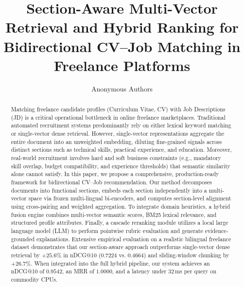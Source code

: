 \documentclass[runningheads]{llncs}
\begin{document}
\title{Section-Aware Multi-Vector Retrieval and Hybrid Ranking for Bidirectional CV--Job Matching in Freelance Platforms}


\author{Anonymous Authors}


\maketitle

\begin{abstract}
Matching freelance candidate profiles (Curriculum Vitae, CV) with Job Descriptions (JD) is a critical operational bottleneck in online freelance marketplaces. Traditional automated recruitment systems predominantly rely on either lexical keyword matching or single-vector dense retrieval. However, single-vector representations aggregate the entire document into an unweighted embedding, diluting fine-grained signals across distinct sections such as technical skills, practical experience, and education. Moreover, real-world recruitment involves hard and soft business constraints (e.g., mandatory skill overlap, budget compatibility, and experience thresholds) that semantic similarity alone cannot satisfy. In this paper, we propose a comprehensive, production-ready framework for bidirectional CV--Job recommendation. Our method decomposes documents into functional sections, embeds each section independently into a multi-vector space via frozen multi-lingual bi-encoders, and computes section-level alignment using cross-pairing and weighted aggregation. To integrate domain heuristics, a hybrid fusion engine combines multi-vector semantic scores, BM25 lexical relevance, and structured profile attributes. Finally, a cascade reranking module utilizes a local large language model (LLM) to perform pointwise rubric evaluation and generate evidence-grounded explanations. Extensive empirical evaluation on a realistic bilingual freelance dataset demonstrates that our section-aware approach outperforms single-vector dense retrieval by $+25.6\%$ in nDCG@10 ($0.7224$ vs. $0.4664$) and sliding-window chunking by $+26.7\%$. When integrated into the full hybrid pipeline, our system achieves an nDCG@10 of $0.9542$, an MRR of $1.0000$, and a latency under $32$\,ms per query on commodity CPUs.

\end{abstract}
\end{document}
